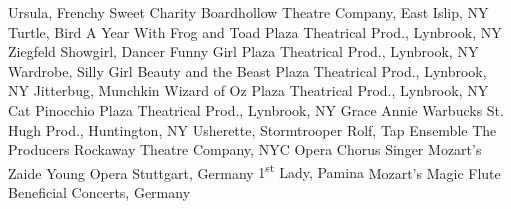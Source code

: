\begin{cventries}
  \cventrytabb %
    {Ursula, Frenchy}%
    {Sweet Charity}%
    {Boardhollow Theatre Company, East Islip, NY}%
    {} %
  \cventrytabb %
    {Turtle, Bird}%
    {A Year With Frog and Toad}%
    {Plaza Theatrical Prod., Lynbrook, NY}%
    {} %
  \cventrytabb %
    {Ziegfeld Showgirl, Dancer}%
    {Funny Girl}%
    {Plaza Theatrical Prod., Lynbrook, NY}%
    {} %
  \cventrytab %
    {Wardrobe, Silly Girl}%
    {Beauty and the Beast}%
    {Plaza Theatrical Prod., Lynbrook, NY}%
    {} %
  \cventrytab %
    {Jitterbug, Munchkin}%
    {Wizard of Oz}%
    {Plaza Theatrical Prod., Lynbrook, NY}%
    {} %
  \cventrytab %
    {Cat}%
    {Pinocchio}%
    {Plaza Theatrical Prod., Lynbrook, NY}%
    {} %
  \cventrytab %
    {Grace}%
    {Annie Warbucks}%
    {St. Hugh Prod., Huntington, NY}%
    {} %
  \cventrytab 
    {Usherette, Stormtrooper Rolf, Tap Ensemble}%
    {The Producers}%
    {Rockaway Theatre Company, NYC}%
    {} %
  \cventrytab
    {Opera Chorus Singer}%
    {Mozart's Zaide}%
    {Young Opera Stuttgart, Germany}%
    {}
  \cventrytab
    {1\textsuperscript{st} Lady, Pamina}
    {Mozart's Magic Flute}
    {Beneficial Concerts, Germany}
    {}
\end{cventries}